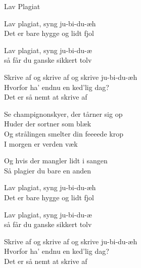 \begin{song}{Lav Plagiat}
  \begin{SBChorus}
    Lav plagiat, syng ju-bi-du-æh  \\
    Det er bare hygge og lidt fjol \\ \medskip
   
    Lav plagiat, syng ju-bi-du-æ \\
    så får du ganske sikkert tolv \\ \medskip
   
    Skrive af og skrive af og skrive ju-bi-du-æh \\
    Hvorfor ha' endnu en ked'lig dag? \\
    Det er så nemt at skrive af \\
  \end{SBChorus}
    


  \begin{SBVerse}
    Se champignonskyer, der tårner sig op \\
    Huder der sortner som blæk \\
    Og strålingen smelter din feeeede krop \\
    I morgen er verden væk \\ \medskip
  
    Og hvis der mangler lidt i sangen \\
    Så plagier du bare en anden \\
  \end{SBVerse}
    
  \begin{SBChorus}
    Lav plagiat, syng ju-bi-du-æh  \\
    Det er bare hygge og lidt fjol \\ \medskip
   
    Lav plagiat, syng ju-bi-du-æ \\
    så får du ganske sikkert tolv \\ \medskip
   
    Skrive af og skrive af og skrive ju-bi-du-æh \\
    Hvorfor ha' endnu en ked'lig dag? \\
    Det er så nemt at skrive af \\
  \end{SBChorus}
\end{song}
